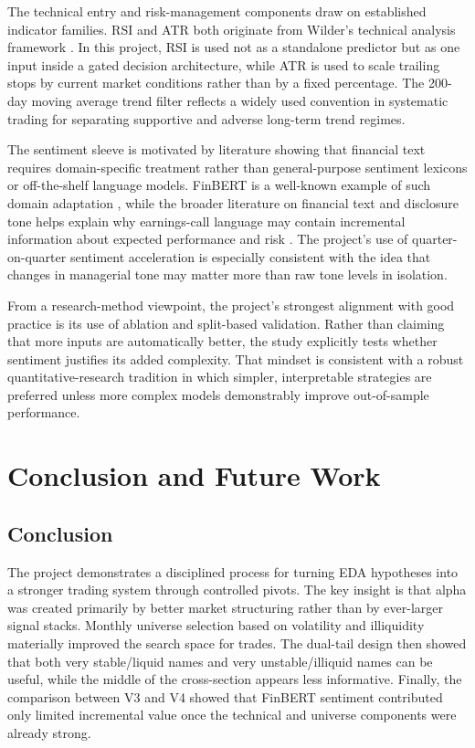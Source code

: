 \documentclass[11pt,twoside,a4paper]{article}
\begin{document}
The technical entry and risk-management components draw on established indicator families. RSI and ATR both originate from Wilder's technical analysis framework \cite{wilder1978}. In this project, RSI is used not as a standalone predictor but as one input inside a gated decision architecture, while ATR is used to scale trailing stops by current market conditions rather than by a fixed percentage. The 200-day moving average trend filter reflects a widely used convention in systematic trading for separating supportive and adverse long-term trend regimes.

The sentiment sleeve is motivated by literature showing that financial text requires domain-specific treatment rather than general-purpose sentiment lexicons or off-the-shelf language models. FinBERT is a well-known example of such domain adaptation \cite{araci2019}, while the broader literature on financial text and disclosure tone helps explain why earnings-call language may contain incremental information about expected performance and risk \cite{loughran2011}. The project's use of quarter-on-quarter sentiment acceleration is especially consistent with the idea that changes in managerial tone may matter more than raw tone levels in isolation.

From a research-method viewpoint, the project's strongest alignment with good practice is its use of ablation and split-based validation. Rather than claiming that more inputs are automatically better, the study explicitly tests whether sentiment justifies its added complexity. That mindset is consistent with a robust quantitative-research tradition in which simpler, interpretable strategies are preferred unless more complex models demonstrably improve out-of-sample performance.

\section{Conclusion and Future Work}
\subsection{Conclusion}
The project demonstrates a disciplined process for turning EDA hypotheses into a stronger trading system through controlled pivots. The key insight is that alpha was created primarily by better market structuring rather than by ever-larger signal stacks. Monthly universe selection based on volatility and illiquidity materially improved the search space for trades. The dual-tail design then showed that both very stable/liquid names and very unstable/illiquid names can be useful, while the middle of the cross-section appears less informative. Finally, the comparison between V3 and V4 showed that FinBERT sentiment contributed only limited incremental value once the technical and universe components were already strong.
\end{document}
